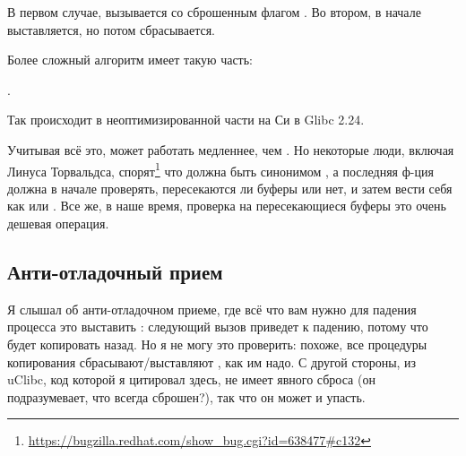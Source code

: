 В первом случае,  вызывается со сброшенным флагом .
Во втором,  в начале выставляется, но потом сбрасывается.

Более сложный алгоритм имеет такую часть:

.

Так происходит в неоптимизированной части на Си в Glibc 2.24.

Учитывая всё это,  может работать медленнее, чем .
Но некоторые люди, включая Линуса Торвальдса, спорят\footnote{\url{https://bugzilla.redhat.com/show_bug.cgi?id=638477\#c132}}
что  должна быть синонимом , а последняя ф-ция должна в начале проверять,
пересекаются ли буферы или нет, и затем вести себя как  или .
Все же, в наше время, проверка на пересекающиеся буферы это очень дешевая операция.

\subsection{Анти-отладочный прием}

Я слышал об анти-отладочном приеме, где всё что вам нужно для падения процесса это выставить : следующий вызов
 приведет к падению, потому что будет копировать назад.
Но я не могу это проверить: похоже, все процедуры копирования сбрасывают/выставляют , как им надо.
С другой стороны,  из uClibc, код которой я цитировал здесь,
не имеет явного сброса  (он подразумевает, что  всегда сброшен?),
так что он может и упасть.

